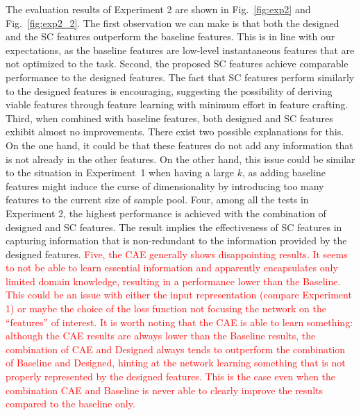 \documentclass{ws-ijsc}
\newcommand{\highlight}[1]{\textcolor{red}{#1}}
\begin{document}

The evaluation results of Experiment 2 are shown in Fig.~\ref{fig:exp2} and Fig.~\ref{fig:exp2_2}. The first observation we can make is that both the designed and the SC features outperform the baseline features. This is in line with our expectations, as the baseline features are low-level instantaneous features that are not optimized to the task.  %
Second, the proposed SC features achieve comparable performance to the designed features. The fact that SC features perform similarly to the designed features is encouraging, suggesting the possibility of deriving viable features through feature learning with minimum effort in feature crafting. 
Third, when combined with baseline features, both designed and SC features exhibit almost no improvements. There exist two possible explanations for this. On the one hand, it could be that these features do not add any information that is not already in the other features. On the other hand, this issue could be similar to the situation in Experiment~1 when having a large $k$, as adding baseline features might induce the curse of dimensionality by introducing too many features to the current size of sample pool. %
Four, among all the tests in Experiment 2, the highest performance is achieved with the combination of designed and SC features. The result implies the effectiveness of SC features in capturing information that is non-redundant to the information provided by the designed features.
\highlight{Five, the CAE generally shows disappointing results. It seems to not be able to learn essential information and apparently encapsulates only limited domain knowledge, resulting in a performance lower than the Baseline. This could be an issue with either the input representation (compare Experiment 1) or maybe the choice of the loss function not focusing the network on the ``features'' of interest. It is worth noting that the CAE is able to learn something: although the CAE results are always lower than the Baseline results, the combination of CAE and Designed always tends to outperform the combination of Baseline and Designed, hinting at the network learning something that is not properly represented by the designed features. This is the case even when the combination CAE and Baseline is never able to clearly improve the results compared to the baseline only.}
\end{document}
